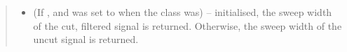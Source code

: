 \documentclass[letterpaper,10pt,english]{sphinxmanual}
\begin{document}
\begin{fulllineitems}
\begin{fulllineitems}
\begin{quote}
\begin{description}
\begin{itemize}
\item {} 
\sphinxAtStartPar
{} (If , and  was set to  when the class was) – initialised, the sweep width of the cut, filtered signal is
returned. Otherwise, the sweep width of the uncut signal is
returned.

\end{itemize}

\end{description}\end{quote}

\end{fulllineitems}


\end{fulllineitems}

\end{document}
